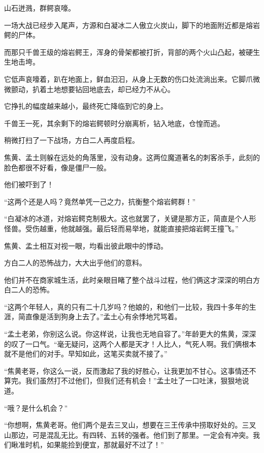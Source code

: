 
\begin{this_body}



山石迸溅，群鳄哀嚎。

一场大战已经步入尾声，方源和白凝冰二人傲立火炭山，脚下的地面附近都是熔岩鳄的尸体。

而那只千兽王级的熔岩鳄王，浑身的骨架都被打折，背部的两个火山凸起，被硬生生地击垮。

它低声哀嚎着，趴在地面上，鲜血汩汩，从身上无数的伤口处流淌出来。它脚爪微微颤动，扒着土地想要钻回地底去，却已经力不从心。

它挣扎的幅度越来越小，最终死亡降临到它的身上。

千兽王一死，其余剩下的熔岩鳄顿时分崩离析，钻入地底，仓惶而逃。

稍微打扫了一下战场，方白二人再度启程。

焦黄、孟土则躲在远处的角落里，没有动身。这两位魔道著名的刺客杀手，此刻的脸色都很不好看，像是僵尸一般。

他们被吓到了！

“这两个还是人吗？竟然单凭一己之力，抗衡整个熔岩鳄群！”

“白凝冰的冰道，对熔岩鳄克制极大。这也就罢了，关键是那方正，简直是个人形怪兽。受伤越重，他就越强。最后轻而易举地，就能直接把熔岩鳄王撞飞。”

焦黄、孟土相互对视一眼，均看出彼此眼中的悸动。

方白二人的恐怖战力，大大出乎他们的意料。

他们并不在商家城生活，此时亲眼目睹了整个战斗过程，他们俩这才深深的明白方白二人的恐怖。

“这两个年轻人，真的只有二十几岁吗？他娘的，和他们一比较，我四十多年的生涯，简直像是活到狗身上去了。”孟土心有余悸地咒骂着。

“孟土老弟，你别这么说。你这样说，让我也无地自容了。”年龄更大的焦黄，深深的叹了一口气。“毫无疑问，这两个人都是天才！人比人，气死人啊。我们俩根本就不是他们的对手。早知如此，这笔买卖就不接了。”

“焦黄老哥，你这么一说，反而激起了我的好胜心，让我更加不甘心。这事情还不算完。我们虽然打不过他们，但我们还有机会！”孟土吐了一口吐沫，狠狠地说道。

“哦？是什么机会？”

“你想啊，焦黄老哥。他们两个是去三叉山，想要在三王传承中捞取好处的。三叉山那边，可是混乱无比。有四转、五转的强者。他们到了那里。一定会有冲突。我们瞅准时机，如果能捡到便宜，那就最好不过了！”


\end{this_body}
